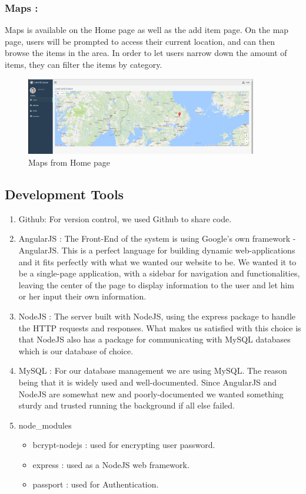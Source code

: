 \documentclass[a4paper]{article}
\begin{document}
\subsubsection{Maps :} Maps is available on the Home page as well as the add item page. On the map page, users will be prompted to access their current location, and can then browse the items in the area. In order to let users narrow down the amount of items, they can filter the items by category.
\begin{figure}[H] 
  \centering
  \includegraphics[width=0.9\textwidth]{home.PNG}\hfill
  \caption{Maps from Home page}\label{home}
\end{figure}

\subsection{Development Tools}
\begin{enumerate}
\item Github: For version control, we used Github to share code.
\item AngularJS : The Front-End of the system is using Google’s own framework - AngularJS. This is a perfect language for building dynamic web-applications and it fits perfectly with what we wanted our website to be. We wanted it to be a single-page application, with a sidebar for navigation and functionalities, leaving the center of the page to display information to the user and let him or her input their own information. 

\item NodeJS : The server built with NodeJS, using the express package to handle the HTTP requests and responses. What makes us satisfied with this choice is that NodeJS also has a package for communicating with MySQL databases which is our database of choice.

\item MySQL : For our database management we are using MySQL. The reason being that it is widely used and well-documented. Since AngularJS and NodeJS are somewhat new and poorly-documented we wanted something sturdy and trusted running the background if all else failed. 
\item node\_modules
\begin{itemize}
\item bcrypt-nodejs : used for encrypting user password. \cite{bcrypt}
\item express : used as a NodeJS web framework. \cite{express}
\item passport : used for Authentication. \cite{authentication}
\end{itemize}
\end{enumerate}
\end{document}
